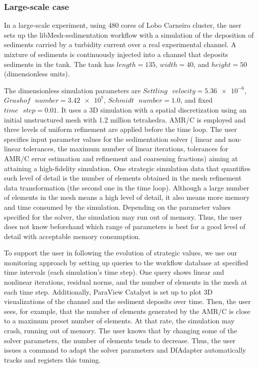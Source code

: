 \subsubsection{Large-scale case}

In a large-scale experiment,  using 480 cores of Lobo Carneiro cluster, the user sets up the libMesh-sedimentation
workflow with a simulation of the deposition of sediments carried by a
turbidity current over a real experimental channel. A mixture of
sediments is continuously injected into a channel that deposits
sediments in the tank. The tank has $length = 135$, $width = 40$, and $height
= 50$ (dimensionless units).

The dimensionless simulation parameters are $Settling \text{ }  velocity =
\num{5.36e-6}$, $Grashof \text{ }  number =
\num{3.42e7}$, $Schmidt \text{ }  number = 1.0$, and fixed $time \text{ }  step =
0.01$.
It uses a 3D simulation with a spatial discretization using an
initial unstructured mesh with 1.2 million tetrahedra. AMR/C is employed
and three levels of uniform refinement are applied before the time loop.
The user specifies input parameter values for the sedimentation solver
(\ie{} linear and non-linear tolerances, the maximum number of linear
iterations, tolerances for AMR/C error estimation and refinement and
coarsening fractions) aiming at attaining a high-fidelity simulation.
One strategic simulation data that quantifies such level of detail is
the number of elements obtained in the mesh refinement data
transformation (the second one in the time loop). Although a large number of
elements in the mesh means a high level of detail, it also means more
memory and time consumed by the simulation. Depending on the parameter
values specified for the solver, the simulation may run out of memory.
Thus, the user does not know beforehand which range of parameters is
best for a good level of detail with acceptable memory consumption.

To support the user in following the evolution of strategic values, we
use our monitoring approach by setting up queries to the workflow database at specified time intervals (each simulation's time step). One query shows
linear and nonlinear iterations, residual norms, and the number of
elements in the mesh at each time step. Additionally, ParaView Catalyst
is set up to plot 3D visualizations of the channel and the sediment
deposits over time. Then, the user sees, for example, that the number of
elements generated by the AMR/C is close to a maximum preset number of
elements. At that rate, the simulation may crash, running out of memory.
The user knows that by changing some of the solver parameters, the
number of elements tends to decrease. Thus, the user issues a command to
adapt the solver parameters and DfAdapter automatically tracks and
registers this tuning.




